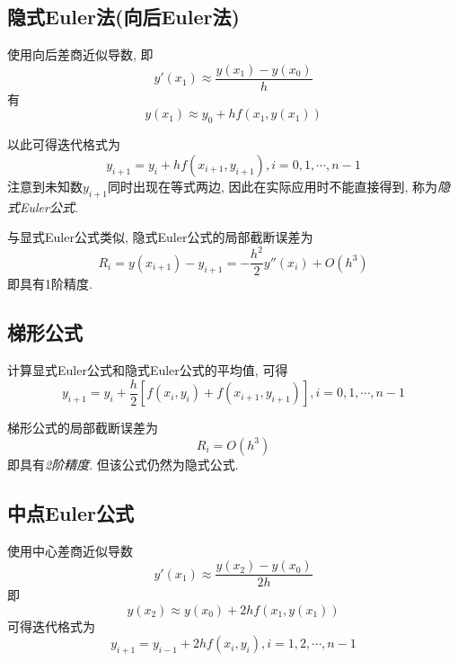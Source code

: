 \subsection{隐式Euler法(向后Euler法)}

使用向后差商近似导数, 即
\begin{equation*}
    y'(x_1)\approx\frac{y(x_1)-y(x_0)}{h}
\end{equation*}
有
\begin{equation*}
    y(x_1)\approx y_0+hf(x_1,y(x_1))
\end{equation*}

以此可得迭代格式为
\begin{equation*}
    y_{i+1}=y_i+hf(x_{i+1},y_{i+1}), i=0,1,\cdots,n-1
\end{equation*}
注意到未知数$y_{i+1}$同时出现在等式两边, 因此在实际应用时不能直接得到, 称为\emph{隐式Euler公式}.

与显式Euler公式类似, 隐式Euler公式的局部截断误差为
\begin{equation*}
    R_i=y(x_{i+1})-y_{i+1}=-\frac{h^2}{2}y''(x_i)+O(h^3)
\end{equation*}
即具有1阶精度.

\subsection{梯形公式}

计算显式Euler公式和隐式Euler公式的平均值, 可得
\begin{equation*}
    y_{i+1}=y_i+\frac{h}{2}[f(x_i,y_i)+f(x_{i+1},y_{i+1})], i=0,1,\cdots,n-1
\end{equation*}

\begin{notice}
    梯形公式的局部截断误差为
    \begin{equation*}
        R_i=O(h^3)
    \end{equation*}
    即具有\emph{2阶精度}. 但该公式仍然为隐式公式.
\end{notice}

\subsection{中点Euler公式}

使用中心差商近似导数
\begin{equation*}
    y'(x_1)\approx\frac{y(x_2)-y(x_0)}{2h}
\end{equation*}
即
\begin{equation*}
    y(x_2)\approx y(x_0)+2hf(x_1,y(x_1))
\end{equation*}
可得迭代格式为
\begin{equation*}
    y_{i+1}=y_{i-1}+2hf(x_i,y_i), i=1,2,\cdots,n-1
\end{equation*}


